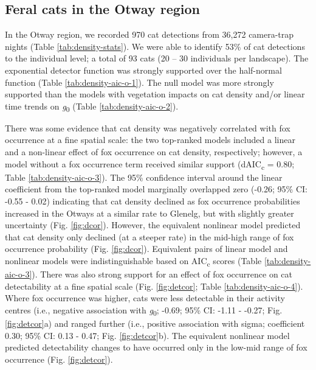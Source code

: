 \documentclass[11pt,a4paper,titlepage,twoside,openright]{style/unimelbthesis}
\begin{document}
\begin{mainmatter}
\hypertarget{feral-cats-in-the-otway-region}{%
\subsection{Feral cats in the Otway region}\label{feral-cats-in-the-otway-region}}

In the Otway region, we recorded 970 cat detections from 36,272 camera-trap nights (Table \ref{tab:density-stats}). We were able to identify 53\% of cat detections to the individual level; a total of 93 cats (20 -- 30 individuals per landscape). The exponential detector function was strongly supported over the half-normal function (Table \ref{tab:density-aic-o-1}). The null model was more strongly supported than the models with vegetation impacts on cat density and/or linear time trends on \emph{g}\textsubscript{0} (Table \ref{tab:density-aic-o-2}).

There was some evidence that cat density was negatively correlated with fox occurrence at a fine spatial scale: the two top-ranked models included a linear and a non-linear effect of fox occurrence on cat density, respectively; however, a model without a fox occurrence term received similar support (dAIC\textsubscript{c} = 0.80; Table \ref{tab:density-aic-o-3}). The 95\% confidence interval around the linear coefficient from the top-ranked model marginally overlapped zero (-0.26; 95\% CI: -0.55 - 0.02) indicating that cat density declined as fox occurrence probabilities increased in the Otways at a similar rate to Glenelg, but with slightly greater uncertainty (Fig. \ref{fig:dcor}). However, the equivalent nonlinear model predicted that cat density only declined (at a steeper rate) in the mid-high range of fox occurrence probability (Fig. \ref{fig:dcor}). Equivalent pairs of linear model and nonlinear models were indistinguishable based on AIC\textsubscript{c} scores (Table \ref{tab:density-aic-o-3}).
There was also strong support for an effect of fox occurrence on cat detectability at a fine spatial scale (Fig. \ref{fig:detcor}; Table \ref{tab:density-aic-o-4}). Where fox occurrence was higher, cats were less detectable in their activity centres (i.e., negative association with \emph{g}\textsubscript{0}; -0.69; 95\% CI: -1.11 - -0.27; Fig. \ref{fig:detcor}a) and ranged further (i.e., positive association with sigma; coefficient 0.30; 95\% CI: 0.13 - 0.47; Fig. \ref{fig:detcor}b). The equivalent nonlinear model predicted detectability changes to have occurred only in the low-mid range of fox occurrence (Fig. \ref{fig:detcor}).


\end{mainmatter}
\end{document}
